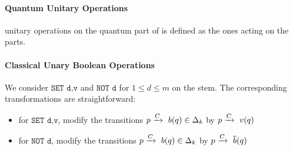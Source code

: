 \documentclass{article}
\begin{document}
\paragraph{Quantum Unitary Operations}
unitary operations on the quantum part of \slsta is defined as the ones acting on the \lsta parts. 

\paragraph{Classical Unary Boolean Operations}
We consider $\texttt{SET\ d,v}$ and $\texttt{NOT\ d}$ for $1 \leq d \leq m$ on the stem. The corresponding \slsta transformations are straightforward:
\begin{itemize}
\item for $\texttt{SET\ d,v}$, modify the transitions ${p}\xrightarrow{C}~{b(q)} \in \Delta_k$ by ${p}\xrightarrow{C}~{v(q)}$
\item for $\texttt{NOT\ d}$, modify the transitions ${p}\xrightarrow{C}~{b(q)} \in \Delta_k$ by ${p}\xrightarrow{C}~{\overline{b}(q)}$
\end{itemize} 
\end{document}
